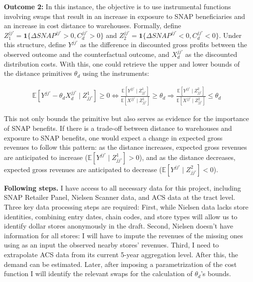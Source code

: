 \documentclass[11pt]{article}
\begin{document}
   
   \textbf{Outcome 2:} In this instance, the objective is to use instrumental functions involving swaps that result in an increase in exposure to SNAP beneficiaries and an increase in cost distance to warehouses. Formally, define $Z^{jj'}_1 = \mathbf{1}\{\Delta SNAP^{jj'} > 0, C_d^{jj'} > 0\}$ and $Z^{jj'}_2 = \mathbf{1}\{\Delta SNAP^{jj'} < 0, C_d^{jj'} < 0\}$. Under this structure, define $Y^{jj'}$ as the difference in discounted gross profits between the observed outcome and the counterfactual outcome, and $X^{jj'}_d$ as the discounted distribution costs. With this, one could retrieve the upper and lower bounds of the distance primitives $\theta_d$ using the instruments:

\vspace{-8mm}

      \begin{align}
          \mathbb{E}[Y^{jj'}-\theta_d X_d^{jj'} \mid Z^{1}_{jj'}] \geq 0 \iff \frac{\mathbb{E}[Y^{jj'}\mid Z^{1}_{jj'}]}{\mathbb{E}[X^{jj'}\mid Z^{1}_{jj'}]}\geq \theta_d  \Rightarrow \frac{\mathbb{E}[Y^{jj'}\mid Z^{2}_{jj'}]}{\mathbb{E}[X^{jj'}\mid Z^{2}_{jj'}]}\leq \theta_d 
      \end{align}

    This not only bounds the primitive but also serves as evidence for the importance of SNAP benefits. If there is a trade-off between distance to warehouses and exposure to SNAP benefits, one would expect a change in expected gross revenues to follow this pattern: as the distance increases, expected gross revenues are anticipated to increase ($\mathbb{E}[Y^{jj'} \mid Z^{1}_{jj'}] > 0$), and as the distance decreases, expected gross revenues are anticipated to decrease ($\mathbb{E}[Y^{jj'} \mid Z^{2}_{jj'}] < 0$).



\textbf{Following steps.}  I have access to all necessary data for this project, including SNAP Retailer Panel, Nielsen Scanner data, and ACS data at the tract level. Three key data processing steps are required: First, while Nielsen data lacks store identities, combining entry dates, chain codes, and store types will allow us to identify dollar stores anonymously in the draft. Second, Nielsen doesn't have information for all stores: I will have to impute the revenues of the missing ones using as an input the observed nearby stores' revenues. Third, I need to extrapolate ACS data from its current 5-year aggregation level. After this, the demand can be estimated. Later, after imposing a parametrization of the cost function I will identify the relevant swaps for the calculation of $\theta_d$'s bounds.
\end{document}
